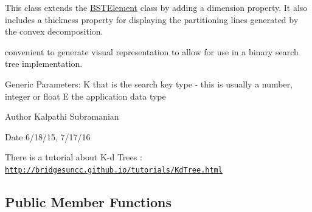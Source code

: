 This class extends the \hyperlink{classbridges_1_1datastructure_1_1_b_s_t_element}{B\+S\+T\+Element} class by adding a dimension property. It also includes a thickness property for displaying the partitioning lines generated by the convex decomposition.

convenient to generate visual representation to allow for use in a binary search tree implementation.

Generic Parameters\+: K that is the search key type -\/ this is usually a number, integer or float E the application data type

\begin{DoxyAuthor}{Author}
Kalpathi Subramanian 
\end{DoxyAuthor}
\begin{DoxyDate}{Date}
6/18/15, 7/17/16
\end{DoxyDate}
There is a tutorial about K-\/d Trees \+: \href{http://bridgesuncc.github.io/tutorials/KdTree.html}{\tt http\+://bridgesuncc.\+github.\+io/tutorials/\+Kd\+Tree.\+html} \subsection*{Public Member Functions}
